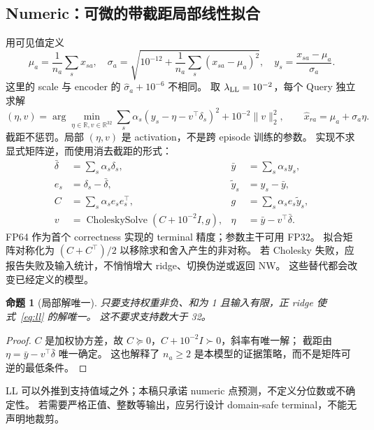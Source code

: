 \documentclass[11pt,UTF8,fontset=fandol]{ctexart}
\newcommand{\R}{\mathbb R}\newcommand{\V}{\mathcal V}\newcommand{\Q}{\mathcal Q}
\newtheorem{proposition}{命题}[section]\renewcommand{\proofname}{证明}
\begin{document}
\subsection{Numeric：可微的带截距局部线性拟合}
用可见值定义
\begin{equation}
 \mu_a=\frac1{n_a}\sum_s x_{sa},\quad
 \sigma_a=\sqrt{10^{-12}+\frac1{n_a}\sum_s(x_{sa}-\mu_a)^2},\quad
 y_s=\frac{x_{sa}-\mu_a}{\sigma_a}.
 \label{eq:target-scale}
\end{equation}
这里的 scale 与 encoder 的 $\widehat\sigma_a+10^{-6}$ 不相同。
取 $\lambda_{\rm LL}=10^{-2}$，每个 Query 独立求解
\begin{equation}
 (\eta,v)=\arg\min_{\eta\in\R,v\in\R^{32}}
 \sum_s\alpha_s(y_s-\eta-v^\top\delta_s)^2+10^{-2}\|v\|_2^2,
 \qquad\widehat x_{ra}=\mu_a+\sigma_a\eta.
 \label{eq:ll}
\end{equation}
截距不惩罚。局部 $(\eta,v)$ 是 activation，不是跨 episode 训练的参数。
实现不求显式矩阵逆，而使用消去截距的形式：
\begin{align}
 \bar\delta&=\sum_s\alpha_s\delta_s,&\bar y&=\sum_s\alpha_sy_s,\\
 e_s&=\delta_s-\bar\delta,&\widetilde y_s&=y_s-\bar y,\\
 C&=\sum_s\alpha_s e_se_s^\top,&g&=\sum_s\alpha_s e_s\widetilde y_s,\\
 v&=\operatorname{CholeskySolve}(C+10^{-2}I,g),&
 \eta&=\bar y-v^\top\bar\delta.
 \label{eq:solve}
\end{align}
FP64 作为首个 correctness 实现的 terminal 精度；参数主干可用 FP32。
拟合矩阵对称化为 $(C+C^\top)/2$ 以移除求和舍入产生的非对称。
若 Cholesky 失败，应报告失败及输入统计，不悄悄增大 ridge、切换伪逆或返回 NW。
这些替代都会改变已经定义的模型。

\begin{proposition}[局部解唯一]
只要支持权重非负、和为 1 且输入有限，正 ridge 使式~\eqref{eq:ll} 的解唯一。
这不要求支持数大于 32。
\end{proposition}
\begin{proof}
$C$ 是加权协方差，故 $C\succeq0$，$C+10^{-2}I\succ0$，斜率有唯一解；
截距由 $\eta=\bar y-v^\top\bar\delta$ 唯一确定。
这也解释了 $n_a\ge2$ 是本模型的证据策略，而不是矩阵可逆的最低条件。
\end{proof}

LL 可以外推到支持值域之外；本稿只承诺 numeric 点预测，不定义分位数或不确定性。
若需要严格正值、整数等输出，应另行设计 domain-safe terminal，不能无声明地裁剪。
\end{document}
